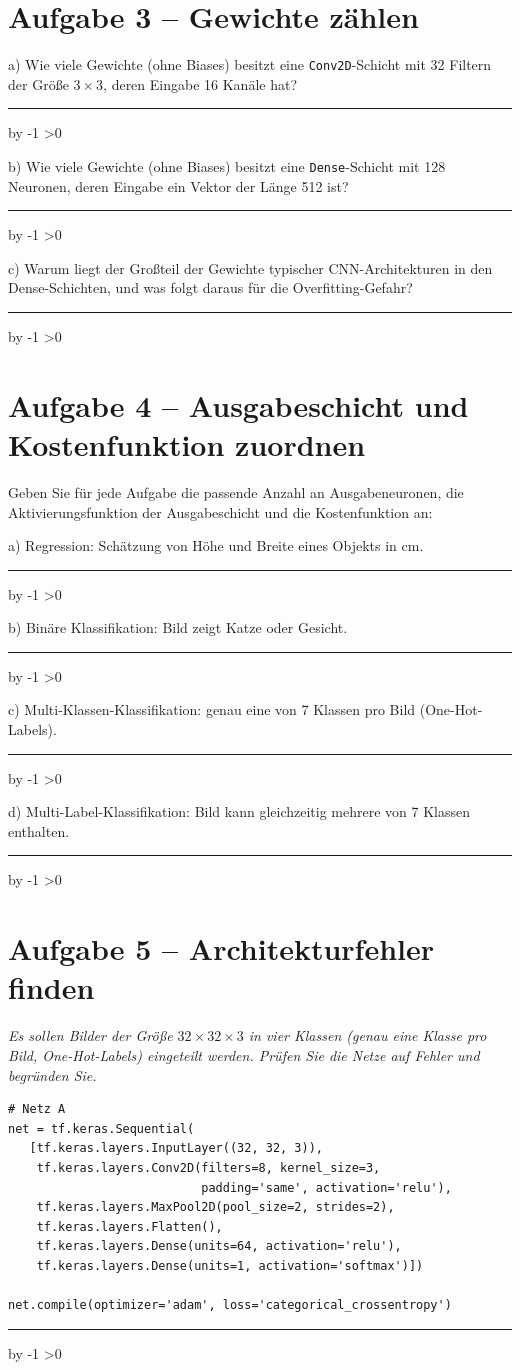 \documentclass[10pt,a4paper]{article}
\newcommand{\antwortlinien}[1]{%
  \par\vspace{2pt}%
  \newcount\zeilen \zeilen=#1
  \loop
    \noindent\rule{\linewidth}{0.4pt}\par\vspace{11pt}%
    \advance\zeilen by -1
  \ifnum\zeilen>0 \repeat
}
\begin{document}
\section*{Aufgabe 3 -- Gewichte zählen}

a) Wie viele Gewichte (ohne Biases) besitzt eine \texttt{Conv2D}-Schicht mit 32 Filtern der
Größe $3\times3$, deren Eingabe 16 Kanäle hat?
\antwortlinien{2}

b) Wie viele Gewichte (ohne Biases) besitzt eine \texttt{Dense}-Schicht mit 128 Neuronen,
deren Eingabe ein Vektor der Länge 512 ist?
\antwortlinien{2}

c) Warum liegt der Großteil der Gewichte typischer CNN-Architekturen in den Dense-Schichten,
und was folgt daraus für die Overfitting-Gefahr?
\antwortlinien{3}

\section*{Aufgabe 4 -- Ausgabeschicht und Kostenfunktion zuordnen}

Geben Sie für jede Aufgabe die passende Anzahl an Ausgabeneuronen, die
Aktivierungsfunktion der Ausgabeschicht und die Kostenfunktion an:

a) Regression: Schätzung von Höhe und Breite eines Objekts in cm.
\antwortlinien{2}

b) Binäre Klassifikation: Bild zeigt Katze oder Gesicht.
\antwortlinien{2}

c) Multi-Klassen-Klassifikation: genau eine von 7 Klassen pro Bild (One-Hot-Labels).
\antwortlinien{2}

d) Multi-Label-Klassifikation: Bild kann gleichzeitig mehrere von 7 Klassen enthalten.
\antwortlinien{2}

\section*{Aufgabe 5 -- Architekturfehler finden}

\emph{Es sollen Bilder der Größe $32\times32\times3$ in vier Klassen (genau eine Klasse pro Bild,
One-Hot-Labels) eingeteilt werden. Prüfen Sie die Netze auf Fehler und begründen Sie.}

\Needspace*{6cm}
\begin{lstlisting}
# Netz A
net = tf.keras.Sequential(
   [tf.keras.layers.InputLayer((32, 32, 3)),
    tf.keras.layers.Conv2D(filters=8, kernel_size=3,
                           padding='same', activation='relu'),
    tf.keras.layers.MaxPool2D(pool_size=2, strides=2),
    tf.keras.layers.Flatten(),
    tf.keras.layers.Dense(units=64, activation='relu'),
    tf.keras.layers.Dense(units=1, activation='softmax')])

net.compile(optimizer='adam', loss='categorical_crossentropy')
\end{lstlisting}
\antwortlinien{3}
\end{document}
